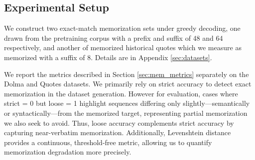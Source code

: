 \documentclass{article} %
\newcommand{\todo}[1]{\textcolor{red}{\textbf{[TODO: #1]}}}
\begin{document}



\subsection{Experimental Setup}
We construct two exact-match memorization sets under greedy decoding, one drawn from the pretraining corpus with a prefix and suffix of 48 and 64 respectively, and another of memorized historical quotes which we measure as memorized with a suffix of 8. Details are in Appendix \ref{sec:datasets}.

We report the metrics described in Section \ref{sec:mem_metrics} separately on the Dolma and Quotes datasets.
We primarily rely on strict accuracy to detect exact memorization in the dataset generation. However for evaluation, cases where strict = 0 but loose = 1 highlight sequences differing only slightly—semantically or syntactically—from the memorized target, representing partial memorization we also seek to avoid. Thus, loose accuracy complements strict accuracy by capturing near-verbatim memorization. Additionally, Levenshtein distance provides a continuous, threshold-free metric, allowing us to quantify memorization degradation more precisely.
\end{document}
